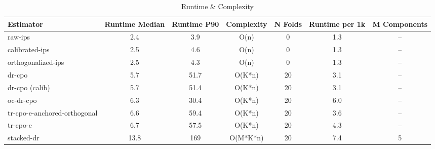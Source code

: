 \begin{table}[htbp]
\centering
\caption{Runtime & Complexity}
\label{tab:A6}
\begin{tabular}{l|cccccc}
\toprule
Estimator & Runtime Median & Runtime P90 & Complexity & N Folds & Runtime per 1k & M Components \\
\midrule
raw-ips & 2.4 & 3.9 & O(n) & 0 & 1.3 & -- \\
calibrated-ips & 2.5 & 4.6 & O(n) & 0 & 1.3 & -- \\
orthogonalized-ips & 2.5 & 4.3 & O(n) & 0 & 1.3 & -- \\
dr-cpo & 5.7 & 51.7 & O(K*n) & 20 & 3.1 & -- \\
dr-cpo (calib) & 5.7 & 51.4 & O(K*n) & 20 & 3.1 & -- \\
oc-dr-cpo & 6.3 & 30.4 & O(K*n) & 20 & 6.0 & -- \\
tr-cpo-e-anchored-orthogonal & 6.6 & 59.4 & O(K*n) & 20 & 3.6 & -- \\
tr-cpo-e & 6.7 & 57.5 & O(K*n) & 20 & 4.3 & -- \\
stacked-dr & 13.8 & 169 & O(M*K*n) & 20 & 7.4 & 5 \\
\bottomrule
\end{tabular}
\end{table}